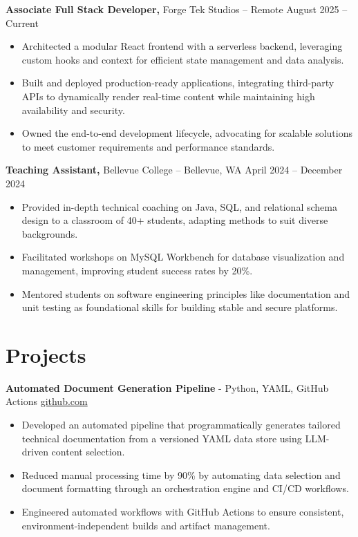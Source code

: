 \documentclass[11pt]{article}       %
\begin{document}
\textbf{Associate Full Stack Developer,} {Forge Tek Studios} -- Remote \hfill August 2025 -- Current 
\vspace{-9pt}
\begin{itemize}
  \item Architected a modular React frontend with a serverless backend, leveraging custom hooks and context for efficient state management and data analysis.
  \item Built and deployed production-ready applications, integrating third-party APIs to dynamically render real-time content while maintaining high availability and security.
  \item Owned the end-to-end development lifecycle, advocating for scalable solutions to meet customer requirements and performance standards.
\end{itemize}

\textbf{Teaching Assistant,} {Bellevue College} -- Bellevue, WA \hfill April 2024 -- December 2024 \\
\vspace{-9pt}
\begin{itemize}
  \item Provided in-depth technical coaching on Java, SQL, and relational schema design to a classroom of 40+ students, adapting methods to suit diverse backgrounds.
  \item Facilitated workshops on MySQL Workbench for database visualization and management, improving student success rates by 20\%.
  \item Mentored students on software engineering principles like documentation and unit testing as foundational skills for building stable and secure platforms.
\end{itemize}

\vspace{-18.5pt}

\section*{Projects}

\textbf{Automated Document Generation Pipeline}{ - Python, YAML, GitHub Actions} \hfill \href{https://github.com/Monica20030707/Tex_OrangeLeaf-mcp}{github.com} \\
\vspace{-9pt}
\begin{itemize}
  \item Developed an automated pipeline that programmatically generates tailored technical documentation from a versioned YAML data store using LLM-driven content selection.
  \item Reduced manual processing time by 90\% by automating data selection and document formatting through an orchestration engine and CI/CD workflows.
  \item Engineered automated workflows with GitHub Actions to ensure consistent, environment-independent builds and artifact management.
\end{itemize}
\end{document}
